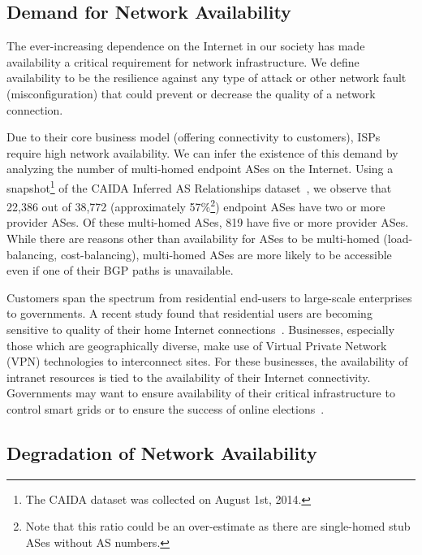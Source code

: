 \subsection{Demand for Network Availability}

The ever-increasing dependence on the Internet in our society has made
availability a critical requirement for network infrastructure. We define
availability to be the resilience against any type of attack or other network
fault (\eg misconfiguration) that could prevent or decrease the quality of a
network connection.

Due to their core business model (\ie offering connectivity to customers), ISPs
require high network availability. We can infer the existence of this demand by
analyzing the number of multi-homed endpoint ASes on the Internet. Using a
snapshot\footnote{The CAIDA dataset was collected on August 1st, 2014.} of the
CAIDA Inferred AS Relationships dataset~\cite{caida}, we observe that 22,386
out of 38,772 (approximately 57\%\footnote{Note that this ratio could be an
over-estimate as there are single-homed stub ASes without AS numbers.})
endpoint ASes have two or more provider ASes. Of these multi-homed ASes, 819
have five or more provider ASes. While there are reasons other than
availability for ASes to be multi-homed (\eg load-balancing, cost-balancing),
multi-homed ASes are more likely to be accessible even if one of their BGP
paths is unavailable.

Customers span the spectrum from residential end-users to large-scale
enterprises to governments.  A recent study found that residential users are
becoming sensitive to quality of their home Internet
connections~\cite{survey2013}. Businesses,  especially those which are
geographically diverse, make use of Virtual Private Network (VPN) technologies
to interconnect sites. For these businesses, the availability of intranet
resources is tied to the availability of their Internet connectivity.
Governments may want to ensure availability of their critical infrastructure
to control smart grids or to ensure the success of online elections~\cite{hk_poll}. 

\subsection{Degradation of Network Availability}
\label{sec:bgp_resilience}

